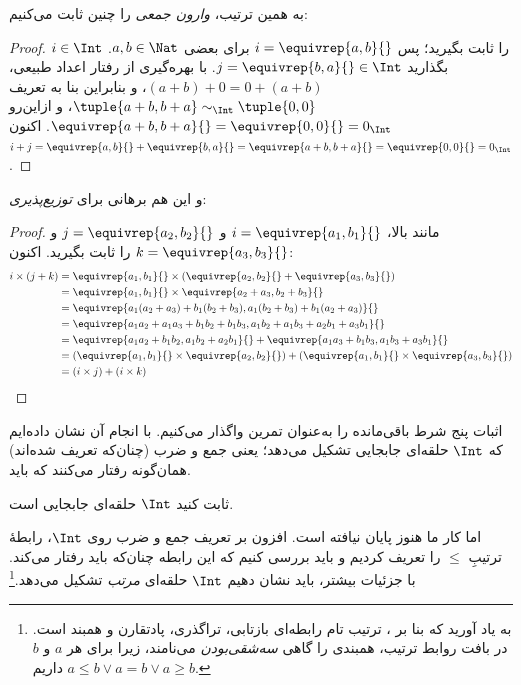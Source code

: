 \documentclass[../../../include/open-logic-section]{subfiles}
\begin{document}
به همین ترتیب، \emph{وارون جمعی} را چنین ثابت می‌کنیم:

\begin{proof}
$i \in \Int$ را ثابت بگیرید؛ پس $i = \equivrep{a,b}{}$ برای بعضی $a,b \in
\Nat$. بگذارید $j = \equivrep{b,a}{} \in \Int$. با بهره‌گیری
از رفتار اعداد طبیعی، $(a+b) + 0 = 0 + (a+b)$، و بنابراین بنا به تعریف
$\tuple{a+b, b+a} \sim_\Int \tuple{0,0}$، و ازاین‌رو
$\equivrep{a+b, b+a}{} = \equivrep{0, 0}{} = 0_\Int$. اکنون $i + j =
\equivrep{a,b}{}+\equivrep{b,a}{}=\equivrep{a+b, b+a}{}= \equivrep{0,
0}{} = 0_\Int$.
\end{proof}

و این هم برهانی برای \emph{توزیع‌پذیری}:

\begin{proof}
مانند بالا، $i = \equivrep{a_1, b_1}{}$ و $j =
\equivrep{a_2,b_2}{}$ و $k = \equivrep{a_3, b_3}{}$ را ثابت بگیرید. اکنون:
\begin{align*}
	i \times (j + k) 
	&= \equivrep{a_1, b_1}{} \times (\equivrep{a_2,b_2}{} + \equivrep{a_3, b_3}{})\\
	&= \equivrep{a_1, b_1}{} \times \equivrep{a_2 + a_3,b_2+b_3}{}\\
	&= \equivrep{a_1  (a_2 + a_3) + b_1  (b_2+b_3), a_1  (b_2 + b_3) + b_1 (a_2 + a_3)}{}\\
	&= \equivrep{a_1 a_2 + a_1a_3 + b_1 b_2+b_1b_3, a_1 b_2 + a_1b_3 + a_2b_1 + a_3b_1}{}\\		
	&= \equivrep{a_1a_2 + b_1b_2, a_1b_2 + a_2b_1}{} + \equivrep{a_1a_3 + b_1b_3, a_1b_3 + a_3b_1}{}\\
	&= (\equivrep{a_1, b_1}{} \times \equivrep{a_2,b_2}{}) + (\equivrep{a_1, b_1}{} \times  \equivrep{a_3, b_3}{})\\
	&= (i \times j) + (i \times k)
\end{align*}
\end{proof}

اثبات پنج شرط باقی‌مانده را به‌عنوان تمرین واگذار می‌کنیم. با انجام آن
نشان داده‌ایم که $\Int$ حلقه‌ای جابجایی تشکیل می‌دهد؛ یعنی جمع و ضرب
(چنان‌که تعریف شده‌اند) همان‌گونه رفتار می‌کنند که باید.

\begin{prob}
ثابت کنید $\Int$ حلقه‌ای جابجایی است.
\end{prob}

اما کار ما هنوز پایان نیافته است. افزون بر تعریف جمع و ضرب روی $\Int$،
رابطهٔ ترتیبِ $\leq$ را تعریف کردیم و باید بررسی کنیم که این رابطه چنان‌که
باید رفتار می‌کند. با جزئیات بیشتر، باید نشان دهیم $\Int$ حلقه‌ای
\emph{مرتب} تشکیل می‌دهد.\footnote{به یاد آورید که بنا بر
	، ترتیب تام رابطه‌ای بازتابی،
	تراگذری، پادتقارن و همبند است. در بافت روابط ترتیب، همبندی را گاهی
	\emph{سه‌شقی‌بودن} می‌نامند، زیرا برای هر $a$ و $b$ داریم $a \leq b \lor a
	= b \lor a \geq b$.}
\end{document}
